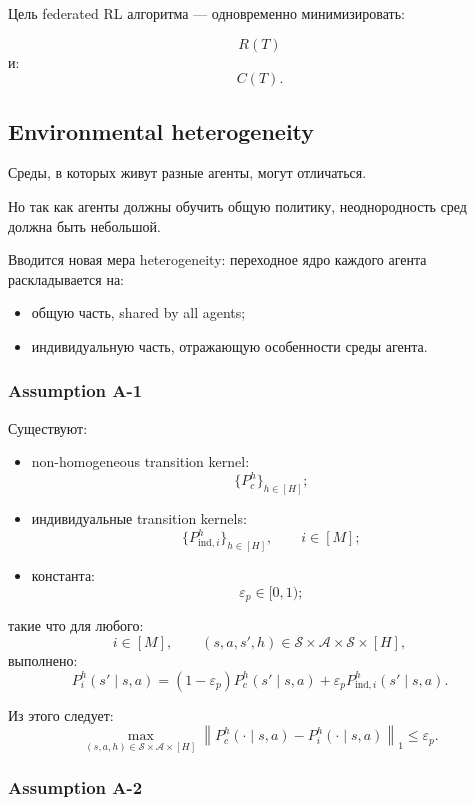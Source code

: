 \documentclass[12pt,a4paper]{article}
\begin{document}
Цель federated RL алгоритма --- одновременно минимизировать:

\[
R(T)
\]
и:
\[
C(T).
\]

\subsection{Environmental heterogeneity}

Среды, в которых живут разные агенты, могут отличаться.

Но так как агенты должны обучить общую политику, неоднородность сред должна быть небольшой.

Вводится новая мера heterogeneity: переходное ядро каждого агента раскладывается на:

\begin{itemize}
    \item общую часть, shared by all agents;
    \item индивидуальную часть, отражающую особенности среды агента.
\end{itemize}

\subsubsection{Assumption A-1}

Существуют:

\begin{itemize}
    \item non-homogeneous transition kernel:
    \[
    \{P_c^h\}_{h\in[H]};
    \]
    \item индивидуальные transition kernels:
    \[
    \{P_{\mathrm{ind},i}^h\}_{h\in[H]},
    \qquad
    i\in[M];
    \]
    \item константа:
    \[
    \varepsilon_p\in[0,1);
    \]
\end{itemize}

такие что для любого:
\[
i\in[M],
\qquad
(s,a,s',h)\in\mathcal S\times\mathcal A\times\mathcal S\times[H],
\]
выполнено:
\[
P_i^h(s'\mid s,a)
=
(1-\varepsilon_p)
P_c^h(s'\mid s,a)
+
\varepsilon_p
P_{\mathrm{ind},i}^h(s'\mid s,a).
\]

Из этого следует:
\[
\max_{(s,a,h)\in\mathcal S\times\mathcal A\times[H]}
\left\|
P_c^h(\cdot\mid s,a)
-
P_i^h(\cdot\mid s,a)
\right\|_1
\le
\varepsilon_p.
\]

\subsubsection{Assumption A-2}
\end{document}
